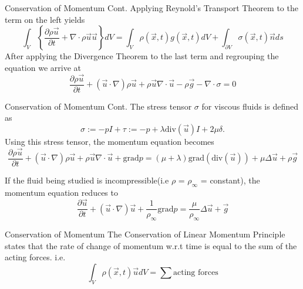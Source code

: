 \documentclass[frames]{prosper}
\begin{document}
\begin{slide}[Dissolve]{Conservation of Momentum Cont.}
Applying Reynold's Transport Theorem to the term on the left yields $$ \int_{V} \left\{\frac{\partial \rho \stackrel{\rightarrow}{u}}{\partial t} + \nabla \cdot \rho \stackrel{\rightarrow}{u}\stackrel{\rightarrow}{u}\right\}dV = \int_{V} \rho(\stackrel{\rightarrow}{x},t) g(\stackrel{\rightarrow}{x},t)dV + \int_{\partial V} \sigma(\stackrel{\rightarrow}{x},t)\stackrel{\rightarrow}{n}ds $$
After applying the Divergence Theorem to the last term and regrouping the equation we arrive at $$ \frac{\partial \rho \stackrel{\rightarrow}{u}}{\partial t} + (\stackrel{\rightarrow}{u} \cdot \nabla)\rho\stackrel{\rightarrow}{u} + \rho\stackrel{\rightarrow}{u}\nabla \cdot \stackrel{\rightarrow}{u} - \rho \stackrel{\rightarrow}{g} - \nabla \cdot \sigma = 0 $$
\end{slide}

\begin{slide}[Dissolve]{Conservation of Momentum Cont.}
The stress tensor $\sigma$ for viscous fluids is defined as $$ \sigma := -pI + \tau := -p + \lambda \mbox{div}(\stackrel{\rightarrow}{u})I + 2\mu\delta. $$ Using this stress tensor, the momentum equation becomes $$ \frac{\partial \rho \stackrel{\rightarrow}{u}}{\partial t} + (\stackrel{\rightarrow}{u} \cdot \nabla)\rho\stackrel{\rightarrow}{u} + \rho\stackrel{\rightarrow}{u}\nabla\cdot \stackrel{\rightarrow}{u} + \mbox{grad}p = (\mu + \lambda)\mbox{grad}(\mbox{div}(\stackrel{\rightarrow}{u})) + \mu\Delta\stackrel{\rightarrow}{u} + \rho\stackrel{\rightarrow}{g} $$

If the fluid being studied is incompressible(i.e $\rho$ = $\rho_{\infty}$ = constant), the momentum equation reduces to $$ \frac{\partial \stackrel{\rightarrow}{u}}{\partial t} + (\stackrel{\rightarrow}{u} \cdot \nabla)\stackrel{\rightarrow}{u} + \frac{1}{\rho_{\infty}}\mbox{grad}p = \frac{\mu}{\rho_{\infty}}\Delta\stackrel{\rightarrow}{u} + \stackrel{\rightarrow}{g} $$
\end{slide}

\begin{slide}[Dissolve]{Conservation of Momentum}
The Conservation of Linear Momentum Principle states that the rate of change of momentum w.r.t time is equal to the sum of the acting forces.
i.e.
$$\int_{V} \rho(\stackrel{\rightarrow}{x},t) \stackrel{\rightarrow}{u}dV = \sum \mbox{acting forces}$$
\end{slide}
\end{document}
